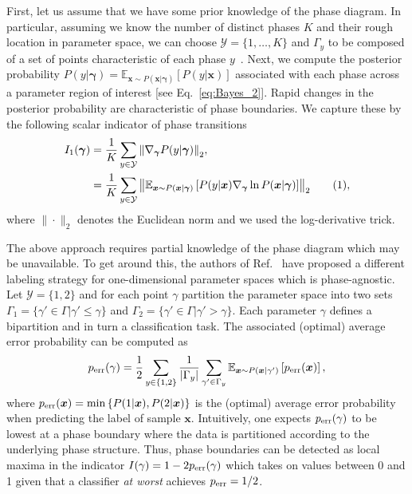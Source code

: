 \documentclass[twocolumn,aps,prl,superscriptaddress,tightlines,nofootinbib]{revtex4-2}
\newcommand\numberthis{\addtocounter{equation}{1}\tag{\theequation}}
\begin{document}
First, let us assume that we have some prior knowledge of the phase diagram. In particular, assuming we know the number of distinct phases $K$ and their rough location in parameter space, we can choose $\mathcal{Y} = \{1,\dots,K \}$ and $\Gamma_{y}$ to be composed of a set of points characteristic of each phase $y$~\cite{carrasquilla:2017}. Next, we compute the posterior probability $P(y|\bm{\gamma}) = \mathbb{E}_{\bm{x} \sim P(\bm{x}|\bm{\gamma})}\left[ P(y|\bm{x}) \right]$ associated with each phase across a parameter region of interest [see Eq.~\eqref{eq:Bayes_2}]. Rapid changes in the posterior probability are characteristic of phase boundaries. We capture these by the following scalar indicator of phase transitions
\begin{align*}\label{eq:ISL}
    I_{1}(\bm{\gamma}) &= \frac{1}{K} \sum_{y \in \mathcal{Y}} \norm{\nabla_{\bm{\gamma}} P(y|\bm{\gamma}) }_{2},\\
    &= \frac{1}{K}\sum_{y \in \mathcal{Y}} \norm{\mathbb{E}_{\bm{x} \sim P(\bm{x}|\bm{\gamma})}\left[P(y|\bm{x}) \nabla_{\bm{\gamma}} \ln P(\bm{x}|\bm{\gamma})\right]}_{2} \numberthis,
\end{align*}
where $\| \cdot \|_{2}$ denotes the Euclidean norm and we used the log-derivative trick.

\indent The above approach requires partial knowledge of the phase diagram which may be unavailable. To get around this, the authors of Ref.~\cite{van:2017} have proposed a different labeling strategy for one-dimensional parameter spaces which is phase-agnostic. Let $\mathcal{Y} = \{1,2\}$ and for each point $\gamma$ partition the parameter space into two sets $\Gamma_{1} = \{ \gamma' \in \Gamma 
 |\gamma' \leq \gamma\}$ and $\Gamma_{2} = \{ \gamma' \in \Gamma | \gamma' > \gamma\}$. Each parameter $\gamma$ defines a bipartition and in turn a classification task. The associated (optimal) average error probability can be computed as
\begin{equation}\label{eq:LBC_err}
    p_{\rm err}(\gamma) = \frac{1}{2}\sum_{y \in \{1,2 \}} \frac{1}{|\Gamma_{y}|}\sum_{\gamma' \in \Gamma_{y}}\mathbb{E}_{\bm{x} \sim P(\bm{x}|\gamma')} \left[p_{\rm err}(\bm{x})\right],
\end{equation}
where $p_{\rm err}(\bm{x}) = {\rm min}\left\{ P(1|\bm{x}), P(2|\bm{x}) \right\}$ is the (optimal) average error probability when predicting the label of sample $\bm{x}$. Intuitively, one expects $p_{\rm err}(\gamma)$ to be lowest at a phase boundary where the data is partitioned according to the underlying phase structure. Thus, phase boundaries can be detected as local maxima in the indicator $I(\gamma) =  1- 2 p_{\rm err}(\gamma)$ which takes on values between 0 and 1 given that a classifier \emph{at worst} achieves $p_{\rm err}=1/2$.
\end{document}
